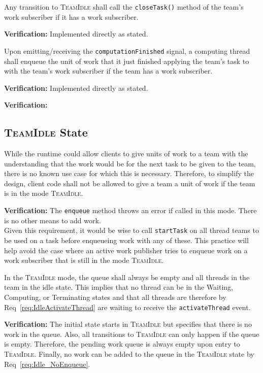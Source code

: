\documentclass{article}
\newcommand{\TeamIdle}          {\textsc{TeamIdle}}
\begin{document}
\begin{req}
Any transition to {\TeamIdle} shall call the \texttt{closeTask()} method of the
team's work subscriber if it has a work subscriber.
\end{req}
\textbf{Verification:}\hspace{0.125in}  Implemented directly as stated.

\begin{req}
Upon emitting/receiving the \texttt{computationFinished} signal, a computing
thread shall enqueue the unit of work that it just finished applying the team's
task to with the team's work subscriber if the team has a work subscriber.
\end{req}
\textbf{Verification:}\hspace{0.125in}  Implemented directly as stated.

\begin{req}
\end{req}
\textbf{Verification:}\hspace{0.125in}

\subsection{{\TeamIdle} State}
\begin{req}
\label{req:Idle_NoEnqueue}
While the runtime could allow clients to give units of work to a team with the
understanding that the work would be for the next task to be given to the team,
there is no known use case for which this is necessary.  Therefore, to simplify
the design, client code shall not be allowed to give a team a unit of work if
the team is in the mode \TeamIdle.  
\end{req}
\textbf{Verification:}\hspace{0.125in}  The \texttt{enqueue} method throws an
error if called in this mode.  There is no other means to add work.\\

Given this requirement, it would be wise to call \texttt{startTask} on all
thread teams to be used on a task before enqueueing work with any of these.  This
practice will help avoid the case where an active work publisher tries to
enqueue work on a work subscriber that is still in the mode \TeamIdle.

\begin{req}
In the {\TeamIdle} mode, the queue shall always be empty and all threads in the
team in the idle state.  This implies that no thread can be in the Waiting,
Computing, or Terminating states and that all threads are therefore by
Req~\ref{req:IdleActivateThread} are waiting to receive the
\texttt{activateThread} event.
\end{req}
\textbf{Verification:}\hspace{0.125in}  The initial state starts in {\TeamIdle}
but specifies that there is no work in the queue.  Also, all transitions to
{\TeamIdle} can only happen if the queue is empty.  Therefore, the pending work
queue is always empty upon entry to \TeamIdle.  Finally, no work can be added
to the queue in the {\TeamIdle} state by Req~\ref{req:Idle_NoEnqueue}.\\
\end{document}
